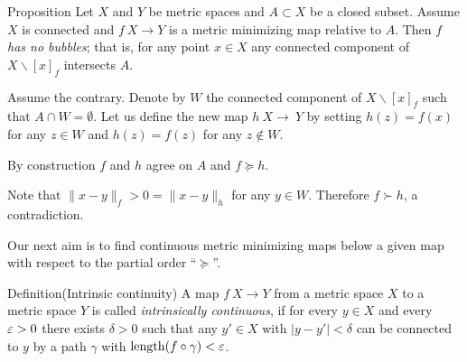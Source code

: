 \documentclass{article}
\begin{document}



\begin{thm}{Proposition}\label{prop:point-complement}
Let $X$ and $Y$ be metric spaces and $A\subset X$ be a closed subset.
Assume $X$ is connected and $f\:X\to Y$ is a metric minimizing map relative to $A$.
Then $f$ \emph{has no bubbles}; that is, for any point $x\in X$ any connected component of $X\backslash [x]_f$ intersects $A$.

\end{thm}

Assume the contrary.
Denote by $W$ the connected component of $X\backslash [x]_f$ such that $A\cap W=\emptyset$.
Let us define the new map $h\:X\to\ Y$ by setting $h(z)=f(x)$ for any $z\in W$ and $h(z)=f(z)$ for any $z\notin W$.

By construction $f$ and $h$ agree on $A$ and $f\succcurlyeq h$.

Note that $\|x-y\|_f>0=\|x-y\|_h$ for any $y\in W$.
Therefore $f\succ h$, a contradiction.
\qeds

Our next aim is to 
find continuous metric minimizing maps below a given map with respect to the partial order ``$\succcurlyeq$''.

\begin{thm}{Definition}(Intrinsic continuity)
A map $f\:X\to Y$ from a metric space $X$ to a metric space
 $Y$ is called
{\em intrinsically continuous}, if for every $y\in X$ 
and every $\varepsilon>0$ there
exists $\delta>0$ such that any  $y'\in X$
with $|y-y'|<\delta$ can be connected to $y$ by a path $\gamma$ 
with $\mathop{\rm length}\nolimits(f\circ\gamma)<\varepsilon$.
\end{thm}
\end{document}
